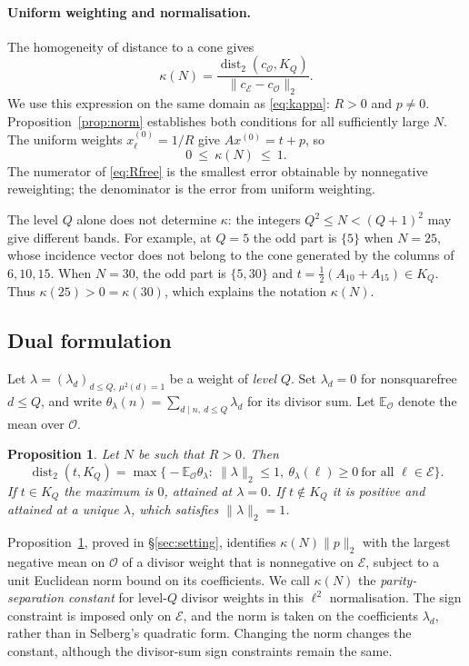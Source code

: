 \documentclass[11pt,a4paper]{article}
\theoremstyle{plain}
\newtheorem{proposition}[theorem]{Proposition}
\theoremstyle{definition}
\theoremstyle{remark}
\DeclareMathOperator{\dist}{dist}
\newcommand{\vB}{\mathcal{E}}
\newcommand{\vR}{\mathcal{O}}
\begin{document}
\paragraph{Uniform weighting and normalisation.}
The homogeneity of distance to a cone gives
\begin{equation}\label{eq:Rfree}
  \kappa(N)=\frac{\dist_{2}(c_{\vR},K_{Q})}{\|c_{\vB}-c_{\vR}\|_{2}} .
\end{equation}
We use this expression on the same domain as \eqref{eq:kappa}: $R>0$ and $p\neq0$.
Proposition~\ref{prop:norm} establishes both conditions for all sufficiently large $N$.
The uniform weights $x^{(0)}_{\ell}=1/R$ give $Ax^{(0)}=t+p$, so
\begin{equation}\label{eq:kappale1}
  0\ \le\ \kappa(N)\ \le\ 1 .
\end{equation}
The numerator of \eqref{eq:Rfree} is the smallest error obtainable by nonnegative reweighting;
the denominator is the error from uniform weighting.

The level $Q$ alone does not determine $\kappa$: the integers $Q^2\le N<(Q+1)^2$ may give different
bands. For example, at $Q=5$ the odd part is $\{5\}$ when $N=25$, whose incidence vector does not belong
to the cone generated by the columns of $6,10,15$. When $N=30$, the odd part is $\{5,30\}$ and
$t=\tfrac12(A_{10}+A_{15})\in K_Q$. Thus $\kappa(25)>0=\kappa(30)$, which explains the notation
$\kappa(N)$.

\subsection{Dual formulation}\label{sec:measures}
Let $\lambda=(\lambda_{d})_{d\le Q,\ \mu^{2}(d)=1}$ be a weight of \emph{level} $Q$.
Set $\lambda_d=0$ for nonsquarefree $d\le Q$, and write
$\theta_{\lambda}(n)=\sum_{d\mid n,\ d\le Q}\lambda_{d}$ for its divisor sum.
Let $\mathbb E_{\vR}$ denote the mean over $\vR$.

\begin{proposition}\label{prop:dual}
Let $N$ be such that $R>0$. Then
\[
  \dist_{2}(t,K_{Q})=\max\bigl\{-\mathbb E_{\vR}\theta_{\lambda}:\
    \|\lambda\|_{2}\le1,\ \theta_{\lambda}(\ell)\ge0\ \text{for all }\ell\in\vB\bigr\}.
\]
If $t\in K_{Q}$ the maximum is $0$, attained at $\lambda=0$. If $t\notin K_{Q}$ it is positive and attained
at a unique $\lambda$, which satisfies $\|\lambda\|_{2}=1$.
\end{proposition}

Proposition~\ref{prop:dual}, proved in \S\ref{sec:setting}, identifies $\kappa(N)\|p\|_2$ with the
largest negative mean on $\vR$ of a divisor weight that is nonnegative on $\vB$, subject to a unit
Euclidean norm bound on its coefficients. We call $\kappa(N)$ the \emph{parity-separation constant}
for level-$Q$ divisor weights in this $\ell^2$ normalisation. The sign constraint is imposed only on
$\vB$, and the norm is taken on the coefficients $\lambda_d$, rather than in Selberg's quadratic form.
Changing the norm changes the constant, although the divisor-sum sign constraints remain the same.
\end{document}

